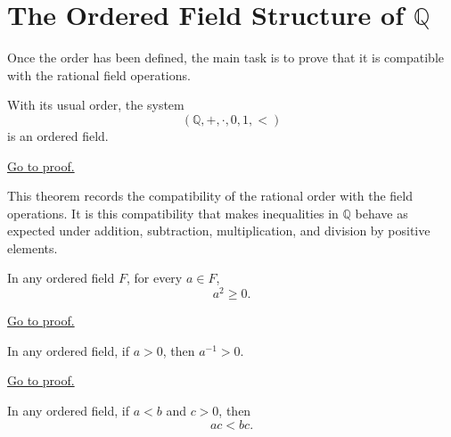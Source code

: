 
\section{The Ordered Field Structure of $\mathbb{Q}$}
\label{sec:ordered-field-structure-q}

Once the order has been defined, the main task is to prove that it is compatible with the rational field operations.

\begin{theorem}
\label{thm:q-is-ordered-field}
With its usual order, the system
\[
(\mathbb{Q},+,\cdot,0,1,<)
\]
is an ordered field.
\end{theorem}

\begin{remark*}[Proof]
\hyperref[prf:q-is-ordered-field]{Go to proof.}
\end{remark*}

\begin{remark}
This theorem records the compatibility of the rational order with the field
operations. It is this compatibility that makes inequalities in $\mathbb{Q}$
behave as expected under addition, subtraction, multiplication, and division
by positive elements.
\end{remark}

\begin{theorem}
\label{thm:squares-nonnegative}
In any ordered field $F$, for every $a\in F$,
\[
a^2\ge 0.
\]
\end{theorem}

\begin{remark*}[Proof]
\hyperref[prf:squares-nonnegative]{Go to proof.}
\end{remark*}

\begin{theorem}
\label{thm:inverse-positive}
In any ordered field, if $a>0$, then $a^{-1}>0$.
\end{theorem}

\begin{remark*}[Proof]
\hyperref[prf:inverse-positive]{Go to proof.}
\end{remark*}

\begin{theorem}
\label{thm:multiply-positive}
In any ordered field, if $a<b$ and $c>0$, then
\[
ac<bc.
\]
\end{theorem}

